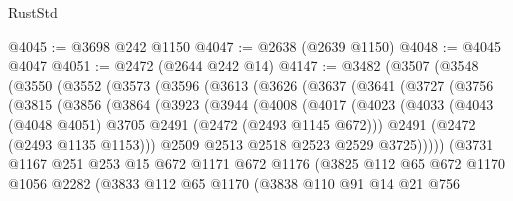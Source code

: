 \begin{lexlean}{RustStd}
\begin{coremodule}
@4045 := @3698 @242 @1150
@4047 := @2638 (@2639 @1150)
@4048 := @4045 @4047
@4051 := @2472 (@2644 @242 @14)
@4147 := @3482
    (@3507
      (@3548
        (@3550
          (@3552
            (@3573
              (@3596
                (@3613
                  (@3626
                    (@3637
                      (@3641
                        (@3727
                          (@3756
                            (@3815
                              (@3856
                                (@3864
                                  (@3923
                                    (@3944
                                      (@4008
                                        (@4017
                                          (@4023
                                            (@4033
                                              (@4043
                                                (@4048 @4051)
                                                @3705
                                                @2491
                                                (@2472 (@2493 @1145 @672)))
                                              @2491
                                              (@2472 (@2493 @1135 @1153)))
                                            @2509
                                            @2513
                                            @2518
                                            @2523
                                            @2529
                                            @3725)))))
                                  (@3731
                                    @1167
                                    @251
                                    @253
                                    @15
                                    @672
                                    @1171
                                    @672
                                    @1176
                                    (@3825
                                      @112
                                      @65
                                      @672
                                      @1170
                                      @1056
                                      @2282
                                      (@3833
                                        @112
                                        @65
                                        @1170
                                        (@3838
                                          @110
                                          @91
                                          @14
                                          @21
                                          @756

\end{coremodule}
\end{lexlean}
